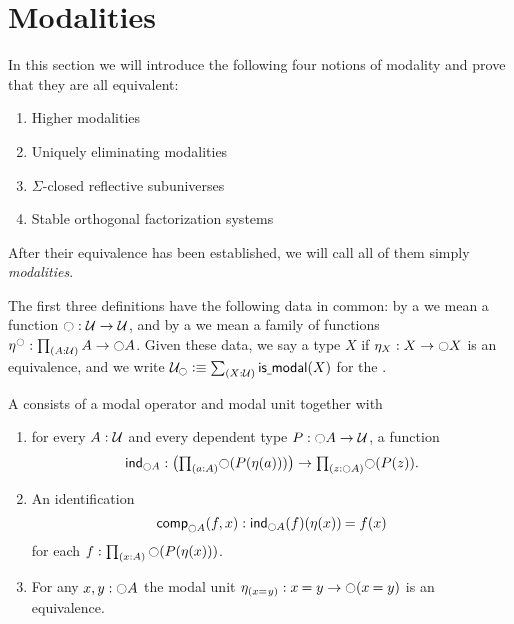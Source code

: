 
\section{Modalities}\label{sec:modal-refl-subun}

In this section we will introduce the following four notions of modality
and prove that they are all equivalent:
\begin{enumerate}
\item Higher modalities
\item Uniquely eliminating modalities
\item $\Sigma$-closed reflective subuniverses
\item Stable orthogonal factorization systems
\end{enumerate}
After their equivalence has been established, we will call all of them simply \emph{modalities}.

The first three definitions have the following data in common: by a  we mean a function $\modal:\UU\to\UU$, and by a  we mean a family of functions $\modalunit^\modal:\prd*{A:\UU}A\to\modal A$.
Given these data, we say a type $X$  if $\modalunit[X]:X\to\modal X$ is an equivalence, and we write $\UU_\modal \defeq \sm{X:\UU} \ismodal(X)$ for the .

\begin{defn}\label{defn:highermod}
A  consists of a modal operator and modal unit together with
\begin{enumerate}
\item for every $A:\UU$ and every dependent type $P:\modal A\to\UU$, a
function
\begin{equation*}
\mathsf{ind}_{\modal A}:\big(\prd{a:A}\modal(P(\eta(a)))\big)\to\prd{z:\modal A}\modal(P(z)).
\end{equation*}
\item An identification
\begin{equation*}
\mathsf{comp}_{\modal A}(f,x):\id{\mathsf{ind}_{\modal A}(f)(\eta(x))}{f(x)}
\end{equation*}
for each $f:\prd{x:A}\modal(P(\eta(x)))$.
\item For any $x,y:\modal A$ the modal unit $\modalunit[(\id{x}{y})]:\id{x}{y}\to \modal(\id{x}{y})$ is an equivalence.
\end{enumerate}
\end{defn}

